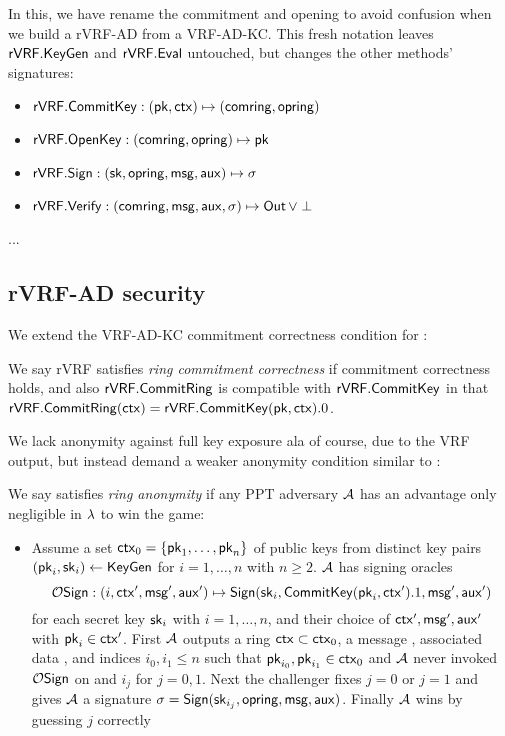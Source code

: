 \def\rSign{\Sign}
\def\rVerify{\Verify}

In this, we have rename the commitment and opening to avoid confusion
when we build a rVRF-AD from a VRF-AD-KC.  This fresh notation leaves
${\mathsf{rVRF}}.{\mathsf{KeyGen}}$ and ${\mathsf{rVRF}}.{\mathsf{Eval}}$ untouched, but
 changes the other methods' signatures:
\begin{itemize}
\item ${\mathsf{rVRF}}.{\mathsf{CommitKey}} : (\mathsf{pk},\mathsf{ctx}) \mapsto (\mathsf{comring},\mathsf{opring})$
\item ${\mathsf{rVRF}}.{\mathsf{OpenKey}} : (\mathsf{comring},\mathsf{opring}) \mapsto \mathsf{pk}$
\item $\rVRF.\rSign : (\sk,\openring,\msg,\aux) \mapsto \sigma$
\item $\rVRF.\rVerify : (\comring,\msg,\aux,\sigma) \mapsto \Out \, \lor \perp$
\end{itemize}

...


\subsection{rVRF-AD security}

We extend the VRF-AD-KC commitment correctness condition for \CommitRing:

\begin{definition}
We say rVRF satisfies {\em ring commitment correctness} if
commitment correctness holds, and also ${\mathsf{rVRF}}.{\mathsf{CommitRing}}$ is 
 compatible with ${\mathsf{rVRF}}.{\mathsf{CommitKey}}$ in that
  ${\mathsf{rVRF}}.{\mathsf{CommitRing}}(\mathsf{ctx}) = {\mathsf{rVRF}}.{\mathsf{CommitKey}}(\mathsf{pk},\mathsf{ctx}).0$.
\end{definition}

We lack anonymity against full key exposure ala
 \cite[pp. 6 Def. 4]{cryptoeprint:2005:304} of course, due to the VRF output,
but instead demand a weaker anonymity condition similar to
 \cite[pp. 5 Def. 3]{cryptoeprint:2005:304}:

\begin{definition}
We say \rVRF satisfies {\em ring anonymity} if
any PPT adversary $\mathcal{A}$ has an advantage only
 negligible in $\lambda$ to win the game:
\begin{itemize}
\item[]
 Assume a set $\mathsf{ctx}_0 = \{ \mathsf{pk}_1,\ldots,\mathsf{pk}_n \}$ of public keys from
 distinct key pairs $(\mathsf{pk}_i,\mathsf{sk}_i) \leftarrow {\ensuremath{\mathsf{KeyGen}}}$ for $i=1,\ldots,n$ with $n \ge 2$.
 $\mathcal{A}$ has signing oracles
 $$ \ora{Sign} : (i,\ctx',\msg',\aux') \mapsto
  \rSign(\sk_i,\CommitKey(\pk_i,\ctx').1,\msg',\aux') $$
 for each secret key $\mathsf{sk}_i$ with $i=1,\ldots,n$, and
 their choice of $\mathsf{ctx}',\mathsf{msg}',\mathsf{aux}'$ with $\mathsf{pk}_i \in \mathsf{ctx}'$.
 First $\mathcal{A}$ outputs a ring $\mathsf{ctx} \subset \mathsf{ctx}_0$,
 a message \msg, associated data \aux, and
 indices $i_0,i_1 \le n$ such that $\mathsf{pk}_{i_0},\mathsf{pk}_{i_1} \in \mathsf{ctx}_0$ and 
 $\mathcal{A}$ never invoked $\mathcal{O}\mathsf{Sign}$ on \msg and $i_j$ for $j=0,1$.
 Next the challenger fixes $j=0$ or $j=1$ and gives
  $\mathcal{A}$ a signature $\sigma = \rSign(\sk_{i_j},\openring,\msg,\aux)$.
 Finally $\mathcal{A}$ wins by guessing $j$ correctly
\end{itemize}
\end{definition}


